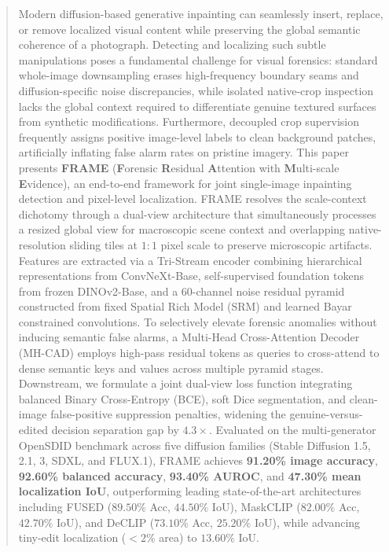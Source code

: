 \begin{abstract}
Modern diffusion-based generative inpainting can seamlessly insert, replace, or remove localized visual content while preserving the global semantic coherence of a photograph. Detecting and localizing such subtle manipulations poses a fundamental challenge for visual forensics: standard whole-image downsampling erases high-frequency boundary seams and diffusion-specific noise discrepancies, while isolated native-crop inspection lacks the global context required to differentiate genuine textured surfaces from synthetic modifications. Furthermore, decoupled crop supervision frequently assigns positive image-level labels to clean background patches, artificially inflating false alarm rates on pristine imagery. This paper presents \textbf{FRAME} (\textbf{F}orensic \textbf{R}esidual \textbf{A}ttention with \textbf{M}ulti-scale \textbf{E}vidence), an end-to-end framework for joint single-image inpainting detection and pixel-level localization. FRAME resolves the scale-context dichotomy through a dual-view architecture that simultaneously processes a resized global view for macroscopic scene context and overlapping native-resolution sliding tiles at $1:1$ pixel scale to preserve microscopic artifacts. Features are extracted via a Tri-Stream encoder combining hierarchical representations from ConvNeXt-Base, self-supervised foundation tokens from frozen DINOv2-Base, and a 60-channel noise residual pyramid constructed from fixed Spatial Rich Model (SRM) and learned Bayar constrained convolutions. To selectively elevate forensic anomalies without inducing semantic false alarms, a Multi-Head Cross-Attention Decoder (MH-CAD) employs high-pass residual tokens as queries to cross-attend to dense semantic keys and values across multiple pyramid stages. Downstream, we formulate a joint dual-view loss function integrating balanced Binary Cross-Entropy (BCE), soft Dice segmentation, and clean-image false-positive suppression penalties, widening the genuine-versus-edited decision separation gap by $4.3\times$. Evaluated on the multi-generator OpenSDID benchmark across five diffusion families (Stable Diffusion 1.5, 2.1, 3, SDXL, and FLUX.1), FRAME achieves \textbf{91.20\% image accuracy}, \textbf{92.60\% balanced accuracy}, \textbf{93.40\% AUROC}, and \textbf{47.30\% mean localization IoU}, outperforming leading state-of-the-art architectures including FUSED ($89.50\%$ Acc, $44.50\%$ IoU), MaskCLIP ($82.00\%$ Acc, $42.70\%$ IoU), and DeCLIP ($73.10\%$ Acc, $25.20\%$ IoU), while advancing tiny-edit localization ($<2\%$ area) to $13.60\%$ IoU.
\end{abstract}
